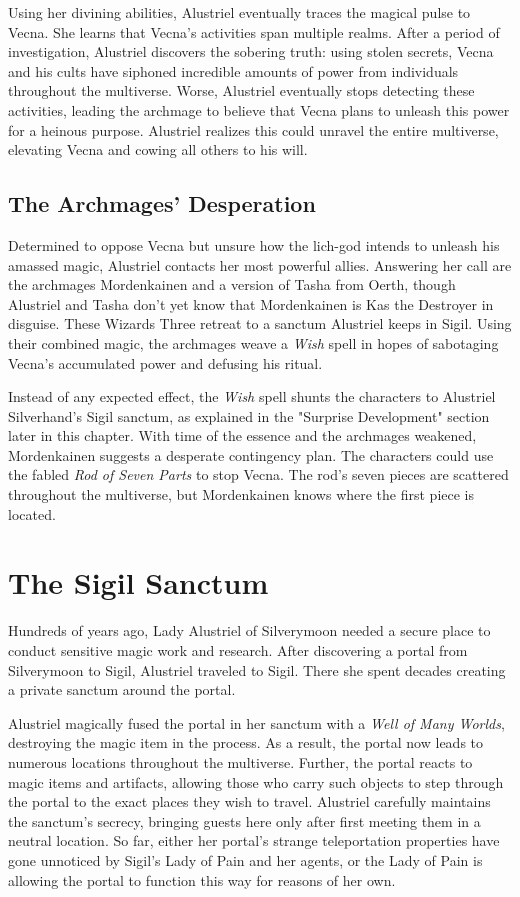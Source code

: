 \documentclass[10pt,a4paper,twoside,bg=print,twocolumn,openany,nodeprecatedcode]{dndbook}
\begin{document}
Using her divining abilities, Alustriel eventually traces the magical pulse to Vecna. She learns that Vecna's activities span multiple realms. After a period of investigation, Alustriel discovers the sobering truth: using stolen secrets, Vecna and his cults have siphoned incredible amounts of power from individuals throughout the multiverse. Worse, Alustriel eventually stops detecting these activities, leading the archmage to believe that Vecna plans to unleash this power for a heinous purpose. Alustriel realizes this could unravel the entire multiverse, elevating Vecna and cowing all others to his will.

\subsection{The Archmages' Desperation}
Determined to oppose Vecna but unsure how the lich-god intends to unleash his amassed magic, Alustriel contacts her most powerful allies. Answering her call are the archmages Mordenkainen and a version of Tasha from Oerth, though Alustriel and Tasha don't yet know that Mordenkainen is Kas the Destroyer in disguise. These Wizards Three retreat to a sanctum Alustriel keeps in Sigil. Using their combined magic, the archmages weave a \textit{Wish} spell in hopes of sabotaging Vecna's accumulated power and defusing his ritual.

Instead of any expected effect, the \textit{Wish} spell shunts the characters to Alustriel Silverhand's Sigil sanctum, as explained in the "Surprise Development" section later in this chapter. With time of the essence and the archmages weakened, Mordenkainen suggests a desperate contingency plan. The characters could use the fabled \textit{Rod of Seven Parts} to stop Vecna. The rod's seven pieces are scattered throughout the multiverse, but Mordenkainen knows where the first piece is located.

\section{The Sigil Sanctum}
Hundreds of years ago, Lady Alustriel of Silverymoon needed a secure place to conduct sensitive magic work and research. After discovering a portal from Silverymoon to Sigil, Alustriel traveled to Sigil. There she spent decades creating a private sanctum around the portal.

Alustriel magically fused the portal in her sanctum with a \textit{Well of Many Worlds}, destroying the magic item in the process. As a result, the portal now leads to numerous locations throughout the multiverse. Further, the portal reacts to magic items and artifacts, allowing those who carry such objects to step through the portal to the exact places they wish to travel. Alustriel carefully maintains the sanctum's secrecy, bringing guests here only after first meeting them in a neutral location. So far, either her portal's strange teleportation properties have gone unnoticed by Sigil's Lady of Pain and her agents, or the Lady of Pain is allowing the portal to function this way for reasons of her own.
\end{document}
